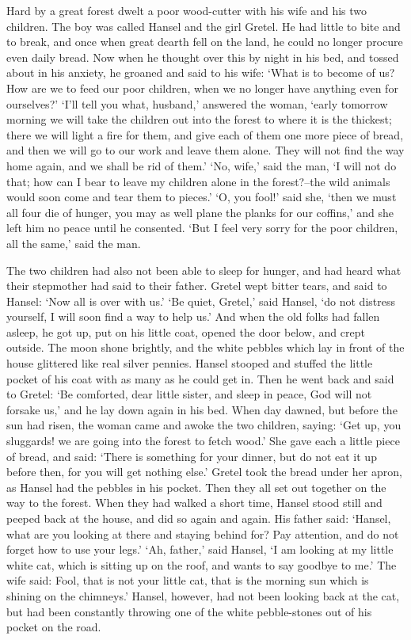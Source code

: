 \documentclass[oneside,11pt]{memoir} %
\begin{document}
Hard by a great forest dwelt a poor wood-cutter with his wife and his two children. The boy was called Hansel and the girl Gretel. He had little to bite and to break, and once when great dearth fell on the land, he could no longer procure even daily bread. Now when he thought over this by night in his bed, and tossed about in his anxiety, he groaned and said to his wife: `What is to become of us? How are we to feed our poor children, when we no longer have anything even for ourselves?' `I'll tell you what, husband,' answered the woman, `early tomorrow morning we will take the children out into the forest to where it is the thickest; there we will light a fire for them, and give each of them one more piece of bread, and then we will go to our work and leave them alone. They will not find the way home again, and we shall be rid of them.' `No, wife,' said the man, `I will not do that; how can I bear to leave my children alone in the forest?--the wild animals would soon come and tear them to pieces.' `O, you fool!' said she, `then we must all four die of hunger, you may as well plane the planks for our coffins,' and she left him no peace until he consented. `But I feel very sorry for the poor children, all the same,' said the man.

The two children had also not been able to sleep for hunger, and had heard what their stepmother had said to their father. Gretel wept bitter tears, and said to Hansel: `Now all is over with us.' `Be quiet, Gretel,' said Hansel, `do not distress yourself, I will soon find a way to help us.' And when the old folks had fallen asleep, he got up, put on his little coat, opened the door below, and crept outside. The moon shone brightly, and the white pebbles which lay in front of the house glittered like real silver pennies. Hansel stooped and stuffed the little pocket of his coat with as many as he could get in. Then he went back and said to Gretel: `Be comforted, dear little sister, and sleep in peace, God will not forsake us,' and he lay down again in his bed. When day dawned, but before the sun had risen, the woman came and awoke the two children, saying: `Get up, you sluggards! we are going into the forest to fetch wood.' She gave each a little piece of bread, and said: `There is something for your dinner, but do not eat it up before then, for you will get nothing else.' Gretel took the bread under her apron, as Hansel had the pebbles in his pocket. Then they all set out together on the way to the forest. When they had walked a short time, Hansel stood still and peeped back at the house, and did so again and again. His father said: `Hansel, what are you looking at there and staying behind for? Pay attention, and do not forget how to use your legs.' `Ah, father,' said Hansel, `I am looking at my little white cat, which is sitting up on the roof, and wants to say goodbye to me.' The wife said: Fool, that is not your little cat, that is the morning sun which is shining on the chimneys.' Hansel, however, had not been looking back at the cat, but had been constantly throwing one of the white pebble-stones out of his pocket on the road.
\end{document}
